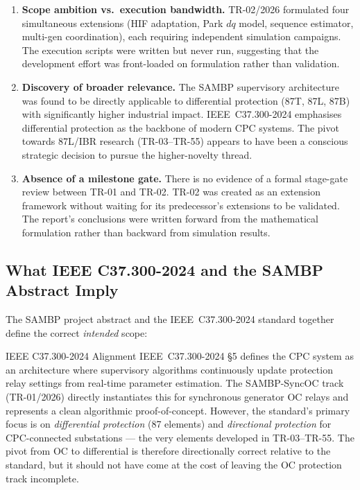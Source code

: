 \documentclass[12pt,a4paper]{article}
\begin{document}
\begin{enumerate}
  \item \textbf{Scope ambition vs.\ execution bandwidth.}  TR-02/2026 formulated
        four simultaneous extensions (HIF adaptation, Park $dq$ model, sequence
        estimator, multi-gen coordination), each requiring independent simulation
        campaigns.  The execution scripts were written but never run, suggesting
        that the development effort was front-loaded on formulation rather than
        validation.

  \item \textbf{Discovery of broader relevance.}  The SAMBP supervisory
        architecture was found to be directly applicable to differential
        protection (87T, 87L, 87B) with significantly higher industrial impact.
        IEEE~C37.300-2024 emphasises differential protection as the backbone of
        modern CPC systems.  The pivot towards 87L/IBR research (TR-03--TR-55)
        appears to have been a conscious strategic decision to pursue the
        higher-novelty thread.

  \item \textbf{Absence of a milestone gate.}  There is no evidence of a
        formal stage-gate review between TR-01 and TR-02.  TR-02 was created as
        an extension framework without waiting for its predecessor's extensions
        to be validated.  The report's conclusions were written forward from the
        mathematical formulation rather than backward from simulation results.
\end{enumerate}

\subsection{What IEEE C37.300-2024 and the SAMBP Abstract Imply}
\label{sec:pivot:standard}

The SAMBP project abstract and the IEEE~C37.300-2024 standard together define
the correct \emph{intended} scope:

\begin{findingbox}{IEEE C37.300-2024 Alignment}
IEEE~C37.300-2024 \S5 defines the CPC system as an architecture where
supervisory algorithms continuously update protection relay settings from
real-time parameter estimation.  The SAMBP-SyncOC track (TR-01/2026) directly
instantiates this for synchronous generator OC relays and represents a clean
algorithmic proof-of-concept.  However, the standard's primary focus is on
\emph{differential protection} (87 elements) and \emph{directional protection}
for CPC-connected substations --- the very elements developed in TR-03--TR-55.
The pivot from OC to differential is therefore directionally correct relative
to the standard, but it should not have come at the cost of leaving the OC
protection track incomplete.
\end{findingbox}
\end{document}
